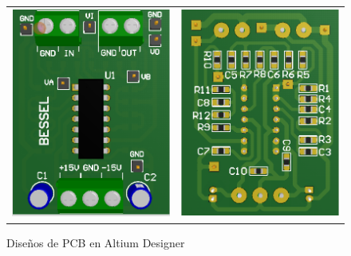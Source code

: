\begin{figure}[H]
\begin{tabular}{c c}
        \includegraphics[scale=0.5]{../EJ1/Recursos/bessel_top_3d.PNG} & 
        \includegraphics[scale=0.5]{../EJ1/Recursos/bessel_bottom_3d.PNG}
    \end{tabular}
    \caption{Dise\~nos de PCB en Altium Designer}
    \label{fig:pcb_altium_3d}
\end{figure}

